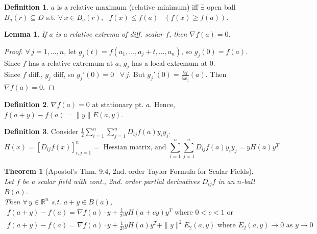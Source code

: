 \documentclass[twoside]{amsart}
\theoremstyle{plain}
\newtheorem{theorem}{Theorem}
\newtheorem{lemma}{Lemma}
\theoremstyle{definition}
\newtheorem{definition}{Definition}
\begin{document}
\begin{definition} $a$ is a relative maximum (relative minimum) iff $\exists$ open ball $B_a(r) \subseteq D$ s.t. $\forall \, x \in B_a(r)$, \, $f(x) \leq f(a)$ \, $(f(x) \geq f(a))$.  
\end{definition}

\begin{lemma} If $a$ is a relative extrema of diff. scalar $f$, then $\nabla f(a) =0$.  
\end{lemma}
\begin{proof} $\forall \, j = 1, \dots, n$, let $g_j(t) = f(a_1,\dots, a_j + t, \dots, a_n)$, so $g_j(0) = f(a)$.  \\
Since $f$ has a relative extremum at $a$, $g_j$ has a local extremum at $0$.  \\
Since $f$ diff., $g_j$ diff, so $g_j'(0)=0$ \, $\forall\, j$.  But $g_j'(0) = \frac{ \partial f}{ \partial x_j}(a)$.  Then $\nabla f(a) =0$. \end{proof}

\begin{definition} $\nabla f(a) =0$ at stationary pt. $a$.  Hence, $f(a+y) - f(a) = \| y \| E(a,y)$.  \end{definition}

\begin{definition} Consider $\frac{1}{2} \sum_{i=1}^n \sum_{j=1}^n D_{ij} f(a) y_i y_j$.  
\[
H(x) = \left[ D_{ij} f(x) \right]_{i,j=1}^n = \text{ Hessian matrix, and } \sum_{i=1}^n \sum_{j=1}^n D_{ij} f(a) y_i y_j = y H(a) y^T
\]
\end{definition}

\begin{theorem}[Apostol's Thm. 9.4, 2nd. order Taylor Formula for Scalar Fields]  Let $f$ be a scalar field with cont., 2nd. order partial derivatives $D_{ij}f$ in an $n$-ball $B(a)$.  \\
  Then $\forall \, y \in \mathbb{R}^n$ s.t. $a+y \in B(a)$, 
\begin{gather}
  f(a+y) - f(a) = \nabla f(a) \cdot y + \frac{1}{2!} y H(a+cy) y^T \text{ where } 0 < c < 1 \text{ or } \\
  f(a+y) - f(a) = \nabla f(a) \cdot y + \frac{1}{2!} y H(a) y^T + \| y \|^2 E_2(a,y) \text{ where } E_2(a,y) \to 0 \text{ as } y \to 0
\end{gather}
\end{theorem}
\end{document}
